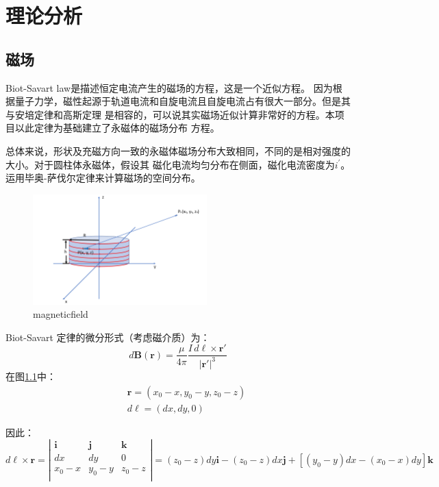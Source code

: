 \documentclass[AutoFakeBold]{LZUThesis}
\begin{document}
\chapter{理论分析}
\section{磁场}
Biot-Savart law\cite{Biot_Savart_Law}是描述恒定电流产生的磁场的方程，这是一个近似方程。
因为根据量子力学，磁性起源于轨道电流和自旋电流且自旋电流占有很大一部分。但是其与安培定律和高斯定理
是相容的，可以说其实磁场近似计算非常好的方程。本项目以此定律为基础建立了永磁体的磁场分布
方程。

总体来说，形状及充磁方向一致的永磁体磁场分布大致相同，不同的是相对强度的大小。对于圆柱体永磁体，假设其
磁化电流均匀分布在侧面，磁化电流密度为$i^{'}$。运用毕奥-萨伐尔定律来计算磁场的空间分布。
\begin{figure}[H]
    \centering
    \includegraphics[width=0.6\textwidth]{figures/magneticfield.png}
    \caption{magneticfield}
    \label{magneticfield}
\end{figure}
Biot-Savart 定律的微分形式（考虑磁介质）为：
\begin{equation}
    d\mathbf {B} (\mathbf {r} )={\frac {\mu}{4\pi }}{\frac {I\,d{\boldsymbol {\ell }}\times \mathbf {r'} }{|\mathbf {r'} |^{3}}}
\end{equation}
在图\ref{magneticfield}中：
\begin{equation}
    \begin{aligned}
        & \quad \mathbf{r} = (x_0 - x, y_0 - y, z_0 - z)\\
        & \quad d\boldsymbol {\ell } = (dx, dy, 0)
    \end{aligned}
\end{equation}

因此：
\begin{equation}
    d\boldsymbol {\ell } \times \mathbf{r} = \left | \begin{matrix}
    \mathbf{i} &\mathbf{j}   &\mathbf{k} \\
    dx &dy &0  \\
    x_0 - x & y_0 - y &z_0 - z \\
    \end{matrix} \right |  = (z_0 - z)dy\mathbf{i} - (z_0 - z)dx\mathbf{j} + 
    [(y_0 - y)dx - (x_0 - x)dy]\mathbf{k}
\end{equation}
\end{document}
